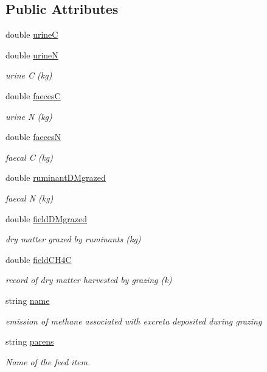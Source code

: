 \subsection*{Public Attributes}
\begin{DoxyCompactItemize}
\item 
double \mbox{\hyperlink{struct_global_vars_1_1grazed_item_ac72be9ee6ad98fd1486cc59fc837e456}{urineC}}
\item 
double \mbox{\hyperlink{struct_global_vars_1_1grazed_item_ad021d48371c858434dac108952954eb1}{urineN}}
\begin{DoxyCompactList}\small\item\em urine C (kg) \end{DoxyCompactList}\item 
double \mbox{\hyperlink{struct_global_vars_1_1grazed_item_a8b81ce35a4a1cda5e92772f4d4fab8dd}{faecesC}}
\begin{DoxyCompactList}\small\item\em urine N (kg) \end{DoxyCompactList}\item 
double \mbox{\hyperlink{struct_global_vars_1_1grazed_item_af238dc9911e605320991d84e4a911c74}{faecesN}}
\begin{DoxyCompactList}\small\item\em faecal C (kg) \end{DoxyCompactList}\item 
double \mbox{\hyperlink{struct_global_vars_1_1grazed_item_ac2c89e55b5d2615210a664cc764817f5}{ruminant\+D\+Mgrazed}}
\begin{DoxyCompactList}\small\item\em faecal N (kg) \end{DoxyCompactList}\item 
double \mbox{\hyperlink{struct_global_vars_1_1grazed_item_af09ff57a40138d2ab7f7bccaec221206}{field\+D\+Mgrazed}}
\begin{DoxyCompactList}\small\item\em dry matter grazed by ruminants (kg) \end{DoxyCompactList}\item 
double \mbox{\hyperlink{struct_global_vars_1_1grazed_item_a1a29ee25c3e36aefdcf9aa5a7a432132}{field\+C\+H4C}}
\begin{DoxyCompactList}\small\item\em record of dry matter harvested by grazing (k) \end{DoxyCompactList}\item 
string \mbox{\hyperlink{struct_global_vars_1_1grazed_item_a90bd7ad02315379fdb3a9873c4f73bd9}{name}}
\begin{DoxyCompactList}\small\item\em emission of methane associated with excreta deposited during grazing \end{DoxyCompactList}\item 
string \mbox{\hyperlink{struct_global_vars_1_1grazed_item_ad571e8aafded85c7897e3d27d2525ecc}{parens}}
\begin{DoxyCompactList}\small\item\em Name of the feed item. \end{DoxyCompactList}\end{DoxyCompactItemize}


